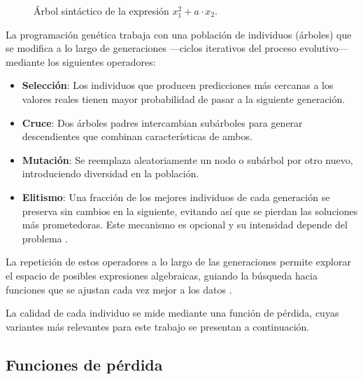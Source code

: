 \begin{figure}[ht]
    \centering
    \caption{Árbol sintáctico de la expresión $x_1^2 + a \cdot x_2$.} \label{fig:arbol_sintactico}
\end{figure}

La programación genética trabaja con una población de individuos (árboles) que se modifica a lo largo de generaciones —ciclos iterativos del proceso evolutivo— mediante los siguientes operadores:

\begin{itemize}
    \item \textbf{Selección}: Los individuos que producen predicciones más cercanas a los valores reales tienen mayor probabilidad de pasar a la siguiente generación.

    \item \textbf{Cruce}: Dos árboles padres intercambian subárboles para generar descendientes que combinan características de ambos.

    \item \textbf{Mutación}: Se reemplaza aleatoriamente un nodo o subárbol por otro nuevo, introduciendo diversidad en la población.

    \item \textbf{Elitismo}: Una fracción de los mejores individuos de cada generación se preserva sin cambios en la siguiente, evitando así que se pierdan las soluciones más prometedoras. Este mecanismo es opcional y su intensidad depende del problema \cite{koza1992genetic}.
\end{itemize}

La repetición de estos operadores a lo largo de las generaciones permite explorar el espacio de posibles expresiones algebraicas, guiando la búsqueda hacia funciones que se ajustan cada vez mejor a los datos \cite{koza1992genetic}.

La calidad de cada individuo se mide mediante una función de pérdida, cuyas variantes más relevantes para este trabajo se presentan a continuación.

\subsection{Funciones de pérdida}

